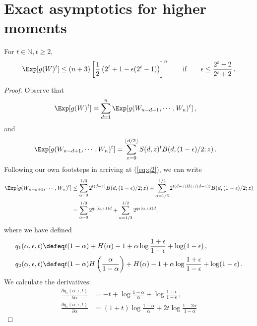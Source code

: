 \section{Exact asymptotics for higher moments}
\begin{proposition}\label{prop:grinding-power-moment}
For $t \in \mathbb{N}, t \geq 2$,
\[
\Exp[ g(W)^t ] 
\leq 
(n+3)\left[\frac{1}{2}\left( 2^t + 1 - \epsilon (2^t -1) \right)\right]^n 
\qquad \text{if} \qquad \epsilon \leq \frac{2^t - 2}{2^t + 2}\, .
\]
\end{proposition}
\begin{proof}
Observe that
\begin{align*}
\Exp[ g(W)^t ]
&= \sum_{d = 1}^n{ \Exp[ g(W_{n-d+1}, \cdots, W_n)^t ] }\, ,
\end{align*}
and
\begin{align*}
\Exp[ g(W_{n-d+1}, \cdots, W_n)^t ] 
&= \sum_{z = 0}^{\lfloor d/2 \rfloor} {S(d,z)^t  B(d, (1-\epsilon)/2; z) } \, .
\end{align*}
Following our own footsteps in arriving at (\ref{eq:q2}), we can write
\begin{align*}
\Exp[ g(W_{n-d+1}, \cdots, W_n)^t ] 
&\leq \sum_{\alpha=0}^{1/3}{2^{t(d-z)} B(d, (1-\epsilon)/2; z) } 
+ \sum_{\alpha=1/3}^{1/2}{2^{t(d-z)H(z/(d-z))} B(d, (1-\epsilon)/2; z) } \\
&= \sum_{\alpha=0}^{1/3}{2^{q_1(\alpha, \epsilon, t)d}} 
+ \sum_{\alpha=1/3}^{1/2}{2^{q_2(\alpha, \epsilon, t)d}} \, ,
\end{align*}
where we have defined
\begin{align} 
q_1(\alpha, \epsilon, t)
& \defeq t(1-\alpha) +
H(\alpha) 
-1  + \alpha \log \frac{1+\epsilon}{1-\epsilon} + \log (1-\epsilon) \label{eq:q1t} \, ,\\
q_2(\alpha, \epsilon, t)
& \defeq t(1-\alpha) H\left( \frac{\alpha}{1-\alpha} \right) +
H(\alpha) 
-1  + \alpha \log \frac{1+\epsilon}{1-\epsilon} + \log (1-\epsilon) \label{eq:q2t}\, .
\end{align}
We calculate the derivatives:
\begin{align*}
\frac{\partial q_1(\alpha, \epsilon, t)}{\partial \alpha}
&= -t 
+ \log \frac{1-\alpha}{\alpha}
+ \log \frac{1+\epsilon}{1-\epsilon} \, ,
\\
\frac{\partial q_1(\alpha, \epsilon, t)}{\partial \alpha}
&= 
(1+t) \log \frac{1-\alpha}{\alpha} 
+ 2 t \log \frac{1 - 2 \alpha}{1 - \alpha}

\end{align*}
\end{proof}
